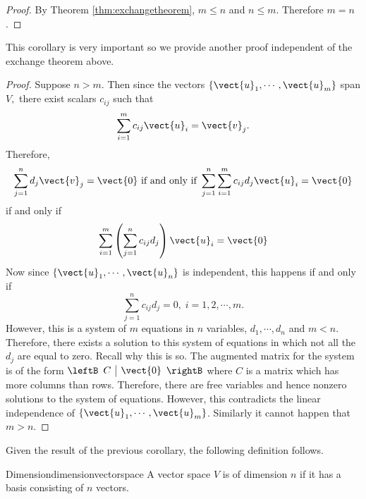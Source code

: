 \begin{proof} By Theorem \ref{thm:exchangetheorem}, $m\leq n$ and $n\leq m$. Therefore $m=n$. 
\end{proof}

This corollary is very important so we provide another proof independent of the exchange theorem above.

\begin{proof}Suppose $n > m.$ Then since the vectors $\left\{ \vect{u}
_{1},\cdots ,\vect{u}_{m}\right\} $ span $V,$ there exist scalars $c_{ij}$
such that 
\begin{equation*}
\sum_{i=1}^{m}c_{ij}\vect{u}_{i}=\vect{v}_{j}.
\end{equation*}
Therefore, 
\begin{equation*}
\sum_{j=1}^{n}d_{j}\vect{v}_{j}=\vect{0}
\text{ if and only if }\sum_{j=1}^{n}\sum_{i=1}^{m}c_{ij}d_{j}\vect{u}_{i}=
\vect{0}
\end{equation*}
if and only if 
\begin{equation*}
\sum_{i=1}^{m}\left( \sum_{j=1}^{n}c_{ij}d_{j}\right) \vect{u}_{i}=\vect{
0}
\end{equation*}
Now since $\{\vect{u}_{1},\cdots ,\vect{u}_{n}\}$ is independent, this
happens if and only if 
\begin{equation*}
\sum_{j=1}^{n}c_{ij}d_{j}=0,\;i=1,2,\cdots ,m.
\end{equation*}
However, this is a system of $m$ equations in $n$ variables, $d_{1},\cdots
,d_{n}$ and $m<n.$ Therefore, there exists a solution to this system of
equations in which not all the $d_{j}$ are equal to zero. Recall why this is
so. The augmented matrix for the system is of the form 
$\leftB 
\begin{array}{c|c}
C & \vect{0}
\end{array}
\rightB $ where $C$ is a matrix which has more columns than rows. Therefore,
there are free variables and hence nonzero solutions to the system of
equations. However, this contradicts the linear independence of $\left\{ 
\vect{u}_{1},\cdots ,\vect{u}_{m}\right\} $. Similarly it cannot happen
that $m > n$.
\end{proof}

Given the result of the previous corollary, the following definition follows.

\begin{definition}{Dimension}{dimensionvectorspace}
 A vector space $V$ is of dimension $n$ if it has a basis consisting of $n$ vectors. 
\end{definition}

